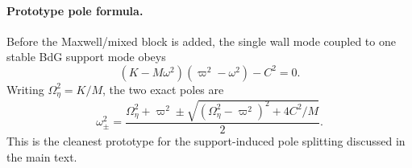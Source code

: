 \documentclass[11pt]{article}
\theoremstyle{definition}
\begin{document}
\paragraph{Prototype pole formula.}
Before the Maxwell/mixed block is added, the single wall mode coupled to one stable BdG support mode obeys
\begin{equation}
 (K-M\omega^2)(\varpi^2-\omega^2)-C^2=0.
 \label{eq:app-bdg-prototype-dispersion}
\end{equation}
Writing $\Omega_\eta^2=K/M$, the two exact poles are
\begin{equation}
 \omega_\pm^2
 =
 \frac{\Omega_\eta^2+\varpi^2
 \pm
 \sqrt{(\Omega_\eta^2-\varpi^2)^2+4C^2/M}}{2}.
 \label{eq:app-bdg-prototype-poles}
\end{equation}
This is the cleanest prototype for the support-induced pole splitting discussed in the main text.
\end{document}
